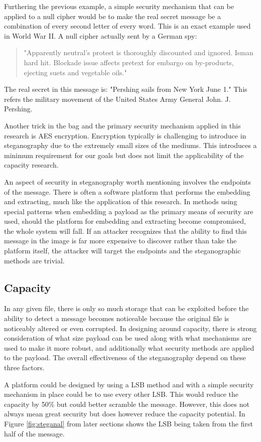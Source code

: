 \documentclass[letterpaper]{article}
\begin{document}
Furthering the previous example, a simple security mechanism that can be applied to a null cipher would be to make the real secret message be a combination of every second letter of every word. This is an exact example used in World War II. A null cipher actually sent by a German spy:
\begin{quote}
"Apparently neutral's protest is thoroughly discounted and ignored. Isman hard hit. Blockade issue affects pretext for embargo on by-products, ejecting suets and vegetable oils."
\end{quote}
The real secret in this message is: "Pershing sails from New York June 1." This refers the military movement of the United States Army General John. J. Pershing.
\cite{johnson1998exploring} 

Another trick in the bag and the primary security mechanism applied in this research is AES encryption. Encryption typically is challenging to introduce in steganography due to the extremely small sizes of the mediums. This introduces a minimum requirement for our goals but does not limit the applicability of the capacity research.

An aspect of security in steganography worth mentioning involves the endpoints of the message. There is often a software platform that performs the embedding and extracting, much like the application of this research. In methods using special patterns when embedding a payload as the primary means of security are used, should the platform for embedding and extracting become compromised, the whole system will fall. If an attacker recognizes that the ability to find this message in the image is far more expensive to discover rather than take the platform itself, the attacker will target the endpoints and the steganographic methods are trivial.  

\subsection{Capacity}
In any given file, there is only so much storage that can be exploited before the ability to detect a message becomes noticeable because the original file is noticeably altered or even corrupted. In designing around capacity, there is strong consideration of what size payload can be used along with what mechanisms are used to make it more robust, and additionally what security methods are applied to the payload. The overall effectiveness of the steganography depend on these three factors.  

A platform could be designed by using a LSB method and with a simple security mechanism in place could be to use every other LSB. This would reduce the capacity by 50\% but could better scramble the message. However, this does not always mean great security but does however reduce the capacity potential. In Figure \ref{fig:steganal} from later sections shows the LSB being taken from the first half of the message.
\end{document}
